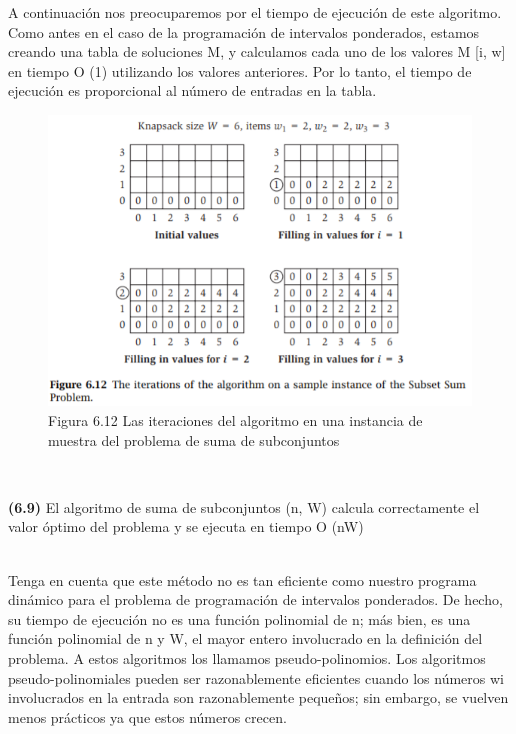 \documentclass[a4paper]{article}
\begin{document}
A continuación nos preocuparemos por el tiempo de ejecución de este algoritmo. Como antes en el caso de la programación de intervalos ponderados, estamos creando una tabla de soluciones M, y calculamos cada uno de los valores M [i, w] en tiempo O (1) utilizando los valores anteriores. Por lo tanto, el tiempo de ejecución es proporcional al número de entradas en la tabla.\\

\begin{figure}[h]
\centering
\includegraphics[scale=1]{Imagenes-Seccion6/fig6_12.PNG}
\caption{Figura 6.12 Las iteraciones del algoritmo en una instancia de muestra del problema de suma de subconjuntos}
\end{figure}\\

\colorbox{mygray}{\parbox{15cm}{
\textbf{(6.9)} El algoritmo de suma de subconjuntos (n, W) calcula correctamente el valor óptimo del problema y se ejecuta en tiempo O (nW)}}\\

Tenga en cuenta que este método no es tan eficiente como nuestro programa dinámico para el problema de programación de intervalos ponderados. De hecho, su tiempo de ejecución no es una función polinomial de n; más bien, es una función polinomial de n y W, el mayor entero involucrado en la definición del problema. A estos algoritmos los llamamos pseudo-polinomios. Los algoritmos pseudo-polinomiales pueden ser razonablemente eficientes cuando los números {wi} involucrados en la entrada son razonablemente pequeños; sin embargo, se vuelven menos prácticos ya que estos números crecen.\\
\end{document}
